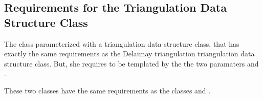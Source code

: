 \subsection{Requirements for the Triangulation Data Structure Class}

The class  parameterized with a
triangulation data structure class, that has exactly the same
requirements as the Delaunay triangulation triangulation data
structure class. But, she requires to be templated by the the two
paramaters  and
.



These two classes have the same requirements as the classes
 and .
